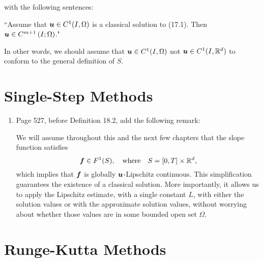 \documentclass{book}
\begin{document}
\begin{enumerate}
	\medskip

with the following sentences:

	\medskip

\hspace{0.5in}``Assume that $\boldsymbol{u}\in C^1(I,\Omega)$ is a classical solution to (17.1). Then $\boldsymbol{u} \in C^{m+1}\left(I;\Omega\right)$."

	\medskip

In other words, we should assume that $\boldsymbol{u}\in C^1(I,\Omega)$ not $\boldsymbol{u} \in  C^1(I,\mathbb R^d)$ to conform to the general definition of $S$.


	\end{enumerate}
	
\chapter{Single-Step Methods}

	\begin{enumerate}
	\item
Page 527, before Definition 18.2, add the following remark:

	\medskip
	
	\begin{rem}
We will assume throughout this and the next few chapters that the slope function satisfies 
	\[
\boldsymbol{f}\in F^1(S), \quad  \mbox{where} \quad  S = [0,T]\times \mathbb R^d,
	\]
which implies that $\boldsymbol{f}$ is globally $\boldsymbol{u}$-Lipschitz continuous. This simplification guarantees the existence of a classical solution. More importantly, it allows us to apply the Lipschitz estimate, with a single constant $L$, with either the solution values or with the approximate solution values, without worrying about whether those values are in some bounded open set $\Omega$. 
	\end{rem}


  
	\end{enumerate}
	
\chapter{Runge-Kutta Methods}
\end{document}
